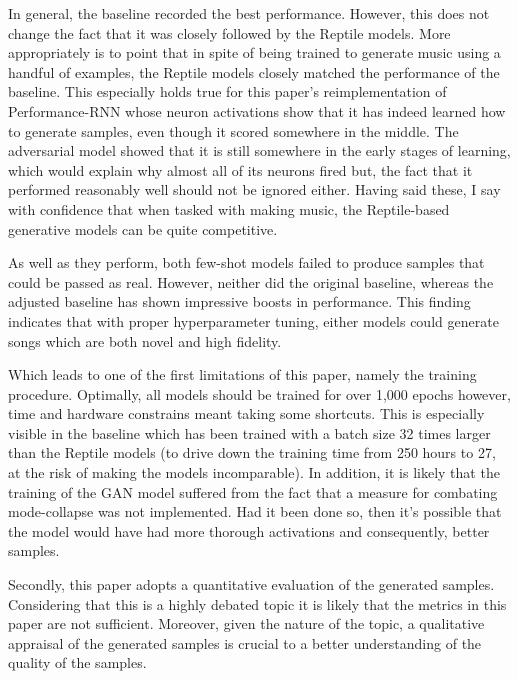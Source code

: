 \documentclass[a4paper]{book}
\begin{document}
In general, the baseline recorded the best performance. However, this does not change the fact that it was closely followed by the Reptile models. More appropriately is to point that in spite of being trained to generate music using a handful of examples, the Reptile models closely matched the performance of the baseline. This especially holds true for this paper's reimplementation of Performance-RNN whose neuron activations show that it has indeed learned how to generate samples, even though it scored somewhere in the middle. The adversarial model showed that it is still somewhere in the early stages of learning, which would explain why almost all of its neurons fired but, the fact that it performed reasonably well should not be ignored either. Having said these, I say with confidence that when tasked with making music, the Reptile-based generative models can be quite competitive.

As well as they perform, both few-shot models failed to produce samples that could be passed as real. However, neither did the original baseline, whereas the adjusted baseline has shown impressive boosts in performance. This finding indicates that with proper hyperparameter tuning, either models could generate songs which are both novel and high fidelity.

Which leads to one of the first limitations of this paper, namely the training procedure. Optimally, all models should be trained for over 1,000 epochs however, time and hardware constrains meant taking some shortcuts. This is especially visible in the baseline which has been trained with a batch size 32 times larger than the Reptile models (to drive down the training time from 250 hours to 27, at the risk of making the models incomparable). In addition, it is likely that the training of the GAN model suffered from the fact that a measure for combating mode-collapse was not implemented. Had it been done so, then it's possible that the model would have had more thorough activations and consequently, better samples.

Secondly, this paper adopts a quantitative evaluation of the generated samples. Considering that this is a highly debated topic \parencite{borji_pros_2018} it is likely that the metrics in this paper are not sufficient. Moreover, given the nature of the topic, a qualitative appraisal of the generated samples is crucial to a better understanding of the quality of the samples.
\end{document}
